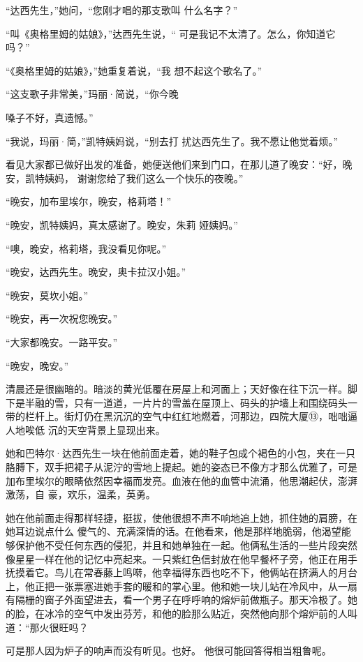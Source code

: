 \documentclass{article}
\begin{document}
“达西先生，”她问，“您刚才唱的那支歌叫
什么名字？” 

“叫《奥格里姆的姑娘》，”达西先生说，“
可是我记不太清了。怎么，你知道它吗？” 

“《奥格里姆的姑娘》，”她重复着说，“我
想不起这个歌名了。” 

“这支歌子非常美，”玛丽·简说，“你今晚
\newpage

嗓子不好，真遗憾。” 

“我说，玛丽·简，”凯特姨妈说，“别去打
扰达西先生了。我不愿让他觉着烦。” 

看见大家都已做好出发的准备，她便送他们来到门口，在那儿道了晚安：“好，晚安，凯特姨妈，
谢谢您给了我们这么一个快乐的夜晚。” 


“晚安，加布里埃尔，晚安，格莉塔！” 

“晚安，凯特姨妈，真太感谢了。晚安，朱莉
娅姨妈。” 


“噢，晚安，格莉塔，我没看见你呢。” 

“晚安，达西先生。晚安，奥卡拉汉小姐。”


“晚安，莫坎小姐。” 


\newpage

“晚安，再一次祝您晚安。” 


“大家都晚安。一路平安。” 


“晚安，晚安。” 

清晨还是很幽暗的。暗淡的黄光低覆在房屋上和河面上；天好像在往下沉一样。脚下是半融的雪，只有一道道，一片片的雪盖在屋顶上、码头的护墙上和围绕码头一带的栏杆上。街灯仍在黑沉沉的空气中红红地燃着，河那边，四院大厦⑬，咄咄逼人地唉低
沉的天空背景上显现出来。 

她和巴特尔·达西先生一块在他前面走着，她的鞋子包成个褐色的小包，夹在一只胳膊下，双手把裙子从泥泞的雪地上提起。她的姿态已不像方才那么优雅了，可是加布里埃尔的眼睛依然因幸福而发亮。血液在他的血管中流涌，他思潮起伏，澎湃激荡，自
豪，欢乐，温柔，英勇。 

她在他前面走得那样轻捷，挺拔，使他很想不声不响地追上她，抓住她的肩膀，在她耳边说点什么
\newpage
傻气的、充满深情的话。在他看来，他是那样地脆弱，他渴望能够保护他不受任何东西的侵犯，并且和她单独在一起。他俩私生活的一些片段突然像星星一样在他的记忆中亮起来。一只紫红色信封放在他早餐杯子旁，他正在用手抚摸着它。鸟儿在常春藤上鸣啭，他幸福得东西也吃不下，他俩站在挤满人的月台上，他正把一张票塞进她手套的暖和的掌心里。他和她一块儿站在冷风中，从一扇有隔栅的窗子外面望进去，看一个男子在呼呼响的熔炉前做瓶子。那天冷极了。她的脸，在冰冷的空气中发出芬芳，和他的脸那么贴近，突然他向那个熔炉前的人叫道：“那火很旺吗？

可是那人因为炉子的响声而没有听见。也好。
他很可能回答得相当粗鲁呢。 
\end{document}
